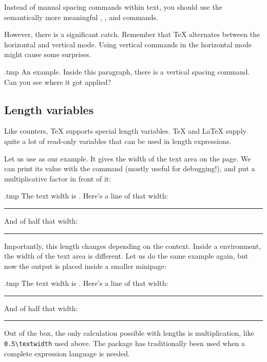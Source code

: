 Instead of manual spacing commands within text,
you should use the semantically more meaningful
, , and  commands.

However, there is a significant catch.
Remember that \TeX{} alternates between the horizontal and vertical mode.
Using vertical commands in the horizontal mode might cause some surprises.
%
\begin{VerbatimOut}{\jobname.tmp}
An example.
\bigskip
Inside this paragraph,
there is a vertical spacing command.
Can you see where it got applied?
\end{VerbatimOut}
\ShowExample


%
%
\subsection{Length variables}\label{sec:lengths}

Like counters, \TeX{} supports special length variables.
\TeX{} and \LaTeX{} supply quite a lot of read-only variables that can be used in length expressions.

Let us use  as our example.
It gives the width of the text area on the page.
We can print its value with the  command (mostly useful for debugging!),
and put a multiplicative factor in front of it:
%
\begin{VerbatimOut}{\jobname.tmp}
The text width is \the\textwidth.
Here's a line of that width:

{\color{blue}\rule{\textwidth}{1pt}}

And of half that width: {\color{blue}\rule{0.5\textwidth}{1pt}}
\end{VerbatimOut}
\ShowExampleBelow

Importantly, this length changes depending on the context.
Inside a  environment, the width of the text area is different.
Let us do the same example again, but now the output is placed inside a smaller minipage:
%
\begin{VerbatimOut}{\jobname.tmp}
The text width is \the\textwidth.
Here's a line of that width:

{\color{blue}\rule{\textwidth}{1pt}}

And of half that width:
{\color{blue}\rule{0.5\textwidth}{1pt}}
\end{VerbatimOut}
\ShowExample

Out of the box, the only calculation possible with lengths is multiplication,
like \verb|0.5\textwidth| used above.
The  package has traditionally been used when a complete expression language is needed.

